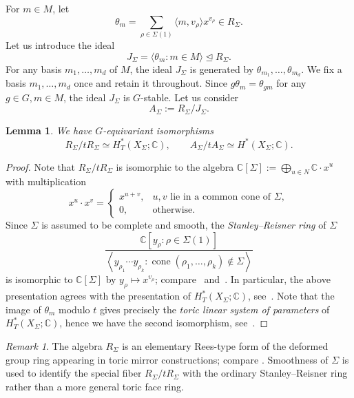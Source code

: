 \documentclass[12pt]{amsart}
\newtheorem{lemma}[theorem]{Lemma}
\theoremstyle{remark}
\newtheorem{remark}[theorem]{Remark}
\begin{document}
For $m\in M$, let
$$  \theta_m
  =\sum_{\rho\in\Sigma(1)}
   \langle m,v_\rho\rangle x^{v_\rho}\in R_\Sigma.
$$
Let us introduce the ideal
$$  J_\Sigma=\langle\theta_m:m\in M\rangle\trianglelefteq R_\Sigma.
$$
For any basis $m_1,\ldots,m_d$ of $M$, the ideal $J_\Sigma$ is generated by
$\theta_{m_1},\ldots,\theta_{m_d}$.
We fix a basis $m_1,\ldots,m_d$ once and retain it throughout.
Since $g\theta_m=\theta_{gm}$ for any $g\in G,m\in M$, the ideal $J_\Sigma$ is $G$-stable.
Let us consider 
$$A_\Sigma := R_\Sigma/J_\Sigma.$$

\begin{lemma}\label{lem:iso0}
We have $G$-equivariant isomorphisms
$$
R_\Sigma/tR_\Sigma \simeq H^*_T(X_\Sigma; \mathbb{C}),\qquad 
A_\Sigma/tA_\Sigma \simeq H^*(X_\Sigma; \mathbb{C}).   
$$
\end{lemma}
\begin{proof}
Note that $R_{\Sigma}/tR_{\Sigma}$ is isomorphic to the algebra $\mathbb{C}[\Sigma]:=\bigoplus_{u\in N}\mathbb{C}\cdot x^u$ with multiplication
$$
x^u\cdot x^v = \begin{cases}
x^{u+v}, & \text{$u,v$ lie in a common cone of $\Sigma$},\\
0, & \text{otherwise}. 
\end{cases}$$
Since $\Sigma$ is assumed to be complete and smooth, the \emph{Stanley--Reisner ring} of $\Sigma$
$$
\frac{\mathbb{C}[y_\rho: \rho\in \Sigma(1)]}
{\left<y_{\rho_1}\cdots y_{\rho_k}: 
\operatorname{cone}(\rho_1,\ldots,\rho_k)\notin \Sigma\right>}
$$
is isomorphic to $\mathbb{C}[\Sigma]$ by 
$y_{\rho}\mapsto x^{v_\rho}$; compare~\cite[Section~5]{BorisovChenSmith} and~\cite{IchimRomer}. 
In particular, the above presentation agrees with the presentation of $H^*_T(X_\Sigma;\mathbb{C})$, see~\cite[Theorem 12.4.14]{CLS}. Note that the image of $\theta_m$ modulo $t$ gives precisely the \emph{toric linear system of parameters} of $H^*_T(X_\Sigma;\mathbb{C})$, hence we have the second isomorphism, see~\cite[Theorem 12.4.4]{CLS}.
\end{proof}

\begin{remark}\label{rem:Rees}
The algebra $R_\Sigma$ is an elementary Rees-type form of the deformed group
ring appearing in toric mirror constructions; compare
\cite[Section 5]{BorisovChenSmith}.  Smoothness of $\Sigma$ is used to identify the special
fiber $R_\Sigma/tR_\Sigma$ with the ordinary Stanley--Reisner ring rather than a more general
toric face ring.
\end{remark}
\end{document}
